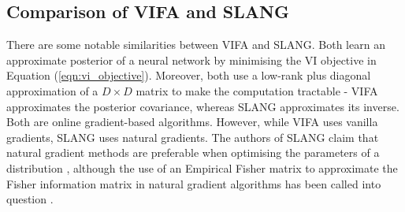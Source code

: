 \documentclass[msc,deptreport.inf]{infthesis} %
\begin{document}
\subsection{Comparison of VIFA and SLANG}

There are some notable similarities between VIFA and SLANG. Both learn an approximate posterior of a neural network by minimising the VI objective in Equation (\ref{eqn:vi_objective}). Moreover, both use a low-rank plus diagonal approximation of a $D \times D$ matrix to make the computation tractable - VIFA approximates the posterior covariance, whereas SLANG approximates its inverse. Both are online gradient-based algorithms. However, while VIFA uses vanilla gradients, SLANG uses natural gradients. The authors of SLANG claim that natural gradient methods are preferable when optimising the parameters of a distribution \cite{mishkin2018}, although the use of an Empirical Fisher matrix to approximate the Fisher information matrix in natural gradient algorithms has been called into question \cite{kunstner2019}.
\end{document}
